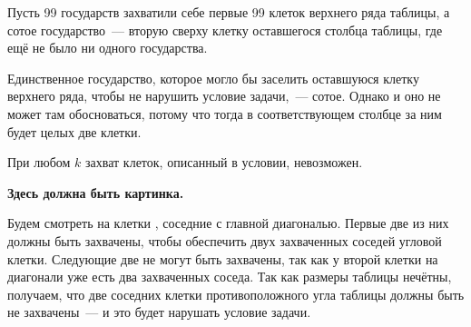\begin{itemize}


\itB Пусть 99 государств захватили себе первые 99 клеток верхнего ряда таблицы, а сотое государство~— вторую сверху клетку оставшегося столбца таблицы, где ещё не было ни одного государства.

Единственное государство, которое могло бы заселить оставшуюся клетку верхнего ряда, чтобы не нарушить условие задачи,~— сотое. Однако и оно не может там обосноваться, потому что тогда в соответствующем столбце за ним будет целых две клетки.

\itC При любом $k$ захват клеток, описанный в условии, невозможен.

{\bf Здесь должна быть картинка.}

Будем смотреть на клетки , соседние с главной диагональю. Первые две из них должны быть захвачены, чтобы обеспечить двух захваченных соседей угловой клетки. Следующие две не могут быть захвачены, так как у второй клетки на диагонали уже есть два захваченных соседа. Так как размеры таблицы нечётны, получаем, что две соседних клетки противоположного угла таблицы должны быть не захвачены~— и это будет нарушать условие задачи.
\end{itemize}
